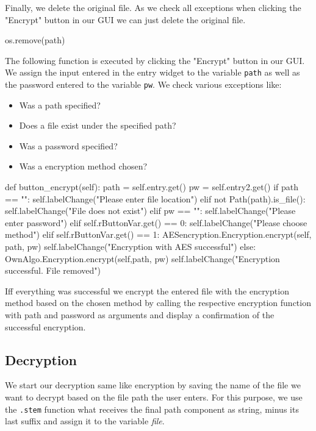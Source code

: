 \documentclass[]{article}
\begin{document}
Finally, we delete the original file. As we check all exceptions when clicking the "Encrypt" button in our
GUI we can just delete the original file.

\begin{python}
os.remove(path)
\end{python}

The following function is executed by clicking the "Encrypt" button in our GUI. We assign the input entered in
the entry widget to the variable \texttt{path} as well as the password entered to the variable \texttt{pw}. 
We check various exceptions like:
\begin{itemize} \label{excep}
    \item Was a path specified?
    \item Does a file exist under the specified path?
    \item Was a password specified?
    \item Was a encryption method chosen?
\end{itemize}

\begin{python}
def button_encrypt(self):
    path = self.entry.get()
    pw = self.entry2.get()
    if path == "":
        self.labelChange("Please enter file location")
    elif not Path(path).is_file():
        self.labelChange("File does not exist")
    elif pw == "":
        self.labelChange("Please enter password")
    elif self.rButtonVar.get() == 0:
        self.labelChange("Please choose method")
    elif self.rButtonVar.get() == 1:
        AESencryption.Encryption.encrypt(self, path, pw)
        self.labelChange("Encryption with AES successful")
    else:
        OwnAlgo.Encryption.encrypt(self,path, pw)
        self.labelChange("Encryption successful. File removed")
\end{python}

Iff everything was successful we encrypt the entered file with the encryption method based on the chosen 
method by calling the respective encryption function with path and password as arguments and display a 
confirmation of the successful encryption.


\subsection{Decryption}
We start our decryption same like encryption by saving the name of the file we want to decrypt based on the file path 
the user enters. For this purpose, we use the \texttt{.stem} function what receives the final path component as string, 
minus its last suffix and assign it to the variable \textit{file}. 
\end{document}
